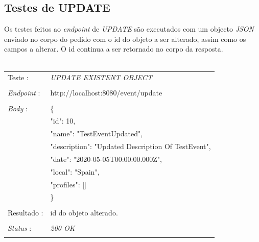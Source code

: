 \subsection{Testes de UPDATE}\label{513}
Os testes feitos ao \emph{endpoint} de \emph{UPDATE} são executados com um objecto \emph{JSON} enviado no corpo do pedido com o id do objeto a ser alterado, assim como os campos a alterar. O id continua a ser retornado no corpo da resposta.\\
\\
\begin{tabular}{ll}
	Teste : & \emph{UPDATE EXISTENT OBJECT}\\
	\\
	\emph{Endpoint} : & http://localhost:8080/event/update\\
	\\
	\emph{Body} : & \{ \\
	& "id": 10, \\
	& "name": "TestEventUpdated",\\
	& "description": "Updated Description Of TestEvent",\\
	& "date": "2020-05-05T00:00:00.000Z",\\
	& "local": "Spain",\\
	& "profiles": []\\
	& \} \\
	\\
	Resultado : & id do objeto alterado.\\
	\\
	\emph{Status} : & \emph{200 OK}\\
	\\
\end{tabular}

